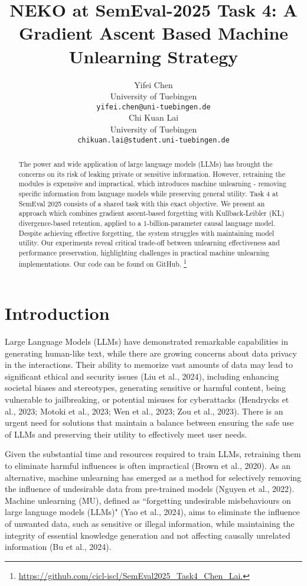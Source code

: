 \documentclass[11pt]{article}
\title{NEKO at SemEval-2025 Task 4: A Gradient Ascent Based Machine Unlearning Strategy}
\author{Yifei Chen \\
  University of Tuebingen\\
  \texttt{yifei.chen@uni-tuebingen.de} \\\And
  Chi Kuan Lai  \\
  University of Tuebingen \\
  \texttt{chikuan.lai@student.uni-tuebingen.de} \\}
\begin{document}
\maketitle
\begin{abstract}
The power and wide application of large language models (LLMs) has brought the concerns on its risk of leaking private or sensitive information. However, retraining the modules is expensive and impractical, which introduces machine unlearning - removing specific information from language models while preserving general utility. Task 4 at SemEval 2025 consists of a shared task with this exact objective. We present an approach which combines gradient ascent-based forgetting with Kullback-Leibler (KL) divergence-based retention, applied to a 1-billion-parameter causal language model. Despite achieving effective forgetting, the system struggles with maintaining model utility. Our experiments reveal critical trade-off between unlearning effectiveness and performance preservation, highlighting challenges in practical machine unlearning implementations. Our code can be found on GitHub. \footnote{\url{https://github.com/cicl-iscl/SemEval2025_Task4_Chen_Lai.}}
\end{abstract}

\section{Introduction}

Large Language Models (LLMs) have demonstrated remarkable capabilities in generating human-like text, while there are growing concerns about data privacy in the interactions. Their ability to memorize vast amounts of data may lead to significant ethical and security issues (Liu et al., 2024), including enhancing societal biases and stereotypes, generating sensitive or harmful content, being vulnerable to jailbreaking, or potential misuses for cyberattacks \citep{HendrycksDan2023AOoC} (Hendrycks et al., 2023; Motoki et al., 2023; Wen et al., 2023; Zou et al., 2023). There is an urgent need for solutions that maintain a balance between ensuring the safe use of LLMs and preserving their utility to effectively meet user needs.

Given the substantial time and resources required to train LLMs, retraining them to eliminate harmful influences is often impractical (Brown et al., 2020). As an alternative, machine unlearning has emerged as a method for selectively removing the influence of undesirable data from pre-trained models (Nguyen et al., 2022). Machine unlearning (MU), defined as ``forgetting undesirable misbehaviours on large language models (LLMs)" (Yao et al., 2024), aims to eliminate the influence of unwanted data, such as sensitive or illegal information, while maintaining the integrity of essential knowledge generation and not affecting causally unrelated information (Bu et al., 2024). 
\end{document}
